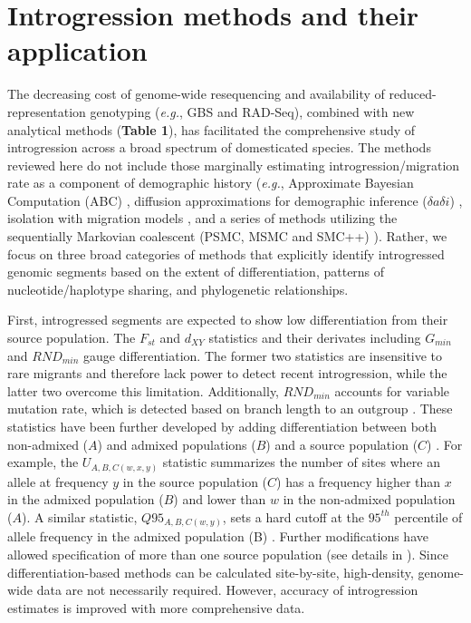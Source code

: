 \documentclass[11pt]{article}
\begin{document}
\section*{Introgression methods and their application}


The decreasing cost of genome-wide resequencing and availability of reduced-representation genotyping (\emph{e.g.}, GBS and RAD-Seq), combined with new analytical methods (\textbf{Table 1}), has facilitated the comprehensive study of introgression across a broad spectrum of domesticated species.
The methods reviewed here do not include those marginally estimating introgression\slash migration rate as a component of demographic history (\emph{e.g.}, Approximate Bayesian Computation (ABC) \cite{beaumont2002}, diffusion approximations for demographic inference ($\delta a\delta i$) \cite{gutenkunst2009}, isolation with migration models \cite{hey2004}, and a series of methods utilizing the sequentially Markovian coalescent (PSMC, MSMC and SMC++) \cite{li2011, schiffels2014, terhorst2017}). 
Rather, we focus on three broad categories of methods that explicitly identify introgressed genomic segments based on the extent of differentiation, patterns of nucleotide/haplotype sharing, and phylogenetic relationships.

First, introgressed segments are expected to show low differentiation from their source population.
The $F_{st}$ and $d_{XY}$ statistics and their derivates including $G_{min}$ \cite{geneva2015} and $RND_{min}$\cite{rosenzweig2016} gauge differentiation. 
The former two statistics are insensitive to rare migrants and therefore lack power to detect recent introgression, while the latter two overcome this limitation.
Additionally, $RND_{min}$ accounts for variable mutation rate, which is detected based on branch length to an outgroup \cite{rosenzweig2016}.
These statistics have been further developed by adding differentiation between both non-admixed ($A$) and admixed populations ($B$) and a source population ($C$) \cite{racimo2016}. 
For example, the $U_{A,B,C(w,x,y)}$ statistic summarizes the number of sites where an allele at frequency $y$ in the source population ($C$) has a frequency higher than $x$ in the admixed population ($B$) and lower than $w$ in the non-admixed population ($A$).
A similar statistic, $Q95_{A,B,C(w,y)}$, sets a hard cutoff at the $95^{th}$ percentile of allele frequency in the admixed population (B) \cite{racimo2016}.
Further modifications have allowed specification of more than one source population (see details in \cite{racimo2016}).
Since differentiation-based methods can be calculated site-by-site, high-density, genome-wide data are not necessarily required.
However, accuracy of introgression estimates is improved with more comprehensive data.
 
\end{document}
